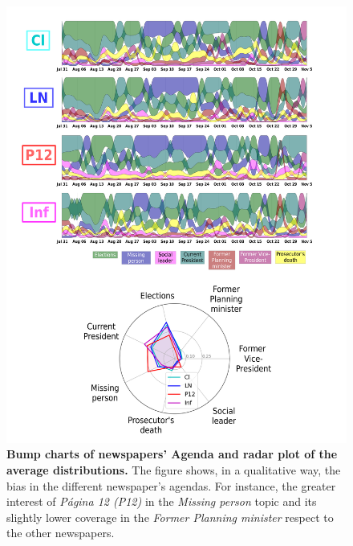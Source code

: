 \documentclass{bmcart}
\begin{document}
\begin{backmatter}
\begin{figure}[h!]
\includegraphics[width = \textwidth]{Fig5.pdf}
\caption{\textbf{Bump charts of newspapers' Agenda and radar plot of the average distributions.} The figure shows, in a qualitative way, the bias in the different newspaper's agendas. For instance, the greater interest of \emph{P\'agina 12 (P12)} in the \emph{Missing person} topic and its slightly lower coverage in the \emph{Former Planning minister} respect to the other newspapers.}
\label{fig:news_agenda}
\end{figure}


\end{backmatter}
\end{document}

